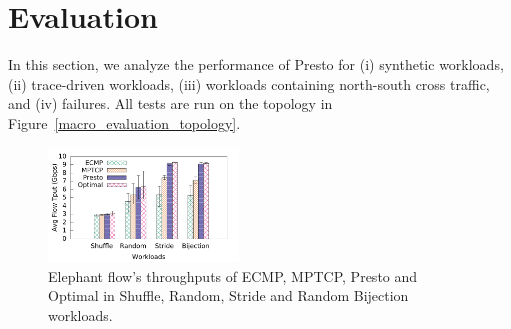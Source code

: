 \section{Evaluation}
\label{sec:eval}

In this section, we analyze the performance of Presto for (i) synthetic workloads, (ii)
trace-driven workloads, (iii) workloads containing north-south cross traffic, and (iv) failures.
All tests are run on the topology in Figure~\ref{macro_evaluation_topology}.
\begin{figure}[!t]
        \centering
  \includegraphics[width=0.45\textwidth]{./figures/macro/stride/macro_compare_tput_witherrbar.pdf}
        \caption{Elephant flow's throughputs of ECMP, MPTCP, Presto and Optimal in Shuffle, Random, Stride and Random Bijection workloads.}
        \label{macro_evaluation_tput}
\end{figure}



